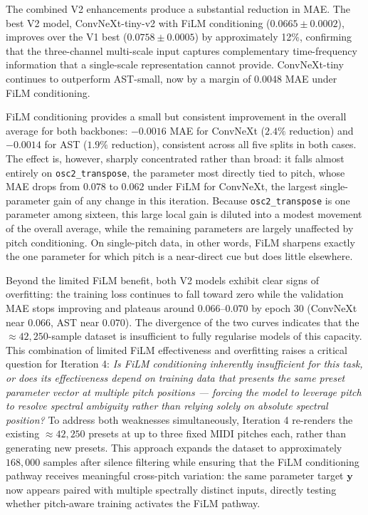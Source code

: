 \noindent
The combined V2 enhancements produce a substantial reduction in MAE. The best V2 model, ConvNeXt-tiny-v2 with FiLM conditioning ($0.0665 \pm 0.0002$), improves over the V1 best ($0.0758 \pm 0.0005$) by approximately 12\%, confirming that the three-channel multi-scale input captures complementary time-frequency information that a single-scale representation cannot provide. ConvNeXt-tiny continues to outperform AST-small, now by a margin of 0.0048 MAE under FiLM conditioning.

\noindent \newline
FiLM conditioning provides a small but consistent improvement in the overall average for both backbones: $-0.0016$ MAE for ConvNeXt ($2.4\%$ reduction) and $-0.0014$ for AST ($1.9\%$ reduction), consistent across all five splits in both cases. The effect is, however, sharply concentrated rather than broad: it falls almost entirely on \texttt{osc2\_transpose}, the parameter most directly tied to pitch, whose MAE drops from $0.078$ to $0.062$ under FiLM for ConvNeXt, the largest single-parameter gain of any change in this iteration. Because \texttt{osc2\_transpose} is one parameter among sixteen, this large local gain is diluted into a modest movement of the overall average, while the remaining parameters are largely unaffected by pitch conditioning. On single-pitch data, in other words, FiLM sharpens exactly the one parameter for which pitch is a near-direct cue but does little elsewhere.

\noindent \newline
Beyond the limited FiLM benefit, both V2 models exhibit clear signs of overfitting: the training loss continues to fall toward zero while the validation MAE stops improving and plateaus around $0.066$–$0.070$ by epoch 30 (ConvNeXt near $0.066$, AST near $0.070$). The divergence of the two curves indicates that the $\approx 42{,}250$-sample dataset is insufficient to fully regularise models of this capacity. This combination of limited FiLM effectiveness and overfitting raises a critical question for Iteration 4: \textit{Is FiLM conditioning inherently insufficient for this task, or does its effectiveness depend on training data that presents the same preset parameter vector at multiple pitch positions — forcing the model to leverage pitch to resolve spectral ambiguity rather than relying solely on absolute spectral position?} To address both weaknesses simultaneously, Iteration 4 re-renders the existing $\approx 42{,}250$ presets at up to three fixed MIDI pitches each, rather than generating new presets. This approach expands the dataset to approximately $168{,}000$ samples after silence filtering while ensuring that the FiLM conditioning pathway receives meaningful cross-pitch variation: the same parameter target $\mathbf{y}$ now appears paired with multiple spectrally distinct inputs, directly testing whether pitch-aware training activates the FiLM pathway.


